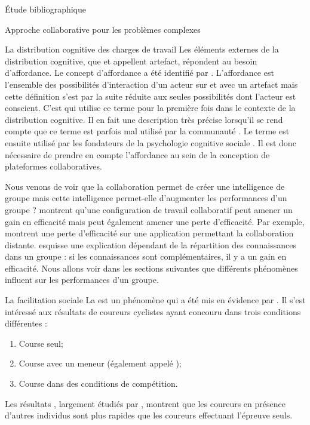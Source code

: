 \documentclass[myfrancais,ngerman,english,french]{mythesis}
\begin{document}
\begin{mychapter}{Étude bibliographique}
\begin{mysection}{Approche collaborative pour les problèmes complexes}
\begin{mysubsection}{La distribution cognitive des charges de travail}
				Les éléments externes de la distribution cognitive, que  et  appellent artefact, répondent au besoin d'affordance.
				Le concept d'affordance a été identifié par .
				L'affordance est l'ensemble des possibilités d'interaction d'un acteur sur et avec un artefact  mais cette définition s'est par la suite réduite aux seules possibilités dont l'acteur est conscient.
				C'est  qui utilise ce terme pour la première fois dans le contexte de la distribution cognitive.
				Il en fait une description très précise lorsqu'il se rend compte que ce terme est parfois mal utilisé par la communauté .
				Le terme est ensuite utilisé par les fondateurs de la psychologie cognitive sociale .
				Il est donc nécessaire de prendre en compte l'affordance au sein de la conception de plateformes collaboratives.

				Nous venons de voir que la collaboration permet de créer une intelligence de groupe mais cette intelligence permet-elle d'augmenter les performances d'un groupe ?
				 montrent qu'une configuration de travail collaboratif peut amener un gain en efficacité mais peut également amener une perte d'efficacité.
				Par exemple,  montrent une perte d'efficacité sur une application permettant la collaboration distante.
				 esquisse une explication dépendant de la répartition des connaissances dans un groupe : si les connaissances sont complémentaires, il y a un gain en efficacité.
				Nous allons voir dans les sections suivantes que différents phénomènes influent sur les performances d'un groupe.
			\end{mysubsection}
			\begin{mysubsection}{La facilitation sociale}
				La  est un phénomène qui a été mis en évidence par .
				Il s'est intéressé aux résultats de coureurs cyclistes ayant concouru dans trois conditions différentes :
				\begin{enumerate}
					\item Course seul;
					\item Course avec un meneur (également appelé );
					\item Course dans des conditions de compétition.
				\end{enumerate}
				Les résultats , largement étudiés par , montrent que les coureurs en présence d'autres individus sont plus rapides que les coureurs effectuant l'épreuve seuls.


\end{mysubsection}
\end{mysection}
\end{mychapter}
\end{document}
